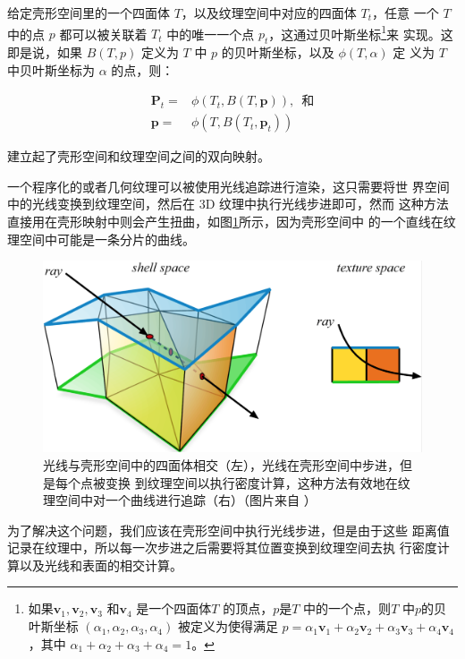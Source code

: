 给定壳形空间里的一个四面体 $T$，以及纹理空间中对应的四面体 $T_t$，任意 一个 $T$ 中的点 $p$ 都可以被关联着 $T_t$ 中的唯一一个点 $p_t$，这通过贝叶斯坐标\footnote{如果$\mathbf{v}_1,\mathbf{v}_2,\mathbf{v}_3$ 和$\mathbf{v}_4$ 是一个四面体$T$ 的顶点，$p$是$T$ 中的一个点，则$T$ 中$p$的贝 叶斯坐标 $(\alpha_1, \alpha_2, \alpha_3, \alpha_4)$ 被定义为使得满足 $p = \alpha_1\mathbf{v}_1 + \alpha_2\mathbf{v}_2 + \alpha_3\mathbf{v}_3 + \alpha_4\mathbf{v}_4$，其中 $\alpha_1 +\alpha_2 +\alpha_3 +\alpha_4 =1$。}来 实现。这即是说，如果 $B(T,p)$ 定义为 $T$ 中 $p$ 的贝叶斯坐标，以及 $\phi(T,\alpha)$ 定 义为 $T$ 中贝叶斯坐标为 $\alpha$ 的点，则：

\begin{equation}
\begin{aligned}
	\mathbf{P}_t=&\phi(T_t,B(T,\mathbf{p})) \text{,~~和}\\
	\mathbf{p}=&\phi(T,B(T_t,\mathbf{p}_t))
\end{aligned}
\end{equation}

\noindent 建立起了壳形空间和纹理空间之间的双向映射。

一个程序化的或者几何纹理可以被使用光线追踪进行渲染，这只需要将世 界空间中的光线变换到纹理空间，然后在 3D 纹理中执行光线步进即可，然而 这种方法直接用在壳形映射中则会产生扭曲，如图\ref{f:df-shell-maps-5}所示，因为壳形空间中 的一个直线在纹理空间中可能是一条分片的曲线。

\begin{figure}
	\includegraphics[width=\textwidth]{figures/df/shell-maps-5}
	\caption{光线与壳形空间中的四面体相交（左），光线在壳形空间中步进，但是每个点被变换 到纹理空间以执行密度计算，这种方法有效地在纹理空间中对一个曲线进行追踪（右）（图片来自 \cite{a:Shell-Maps}）}
	\label{f:df-shell-maps-5}
\end{figure}

为了解决这个问题，我们应该在壳形空间中执行光线步进，但是由于这些 距离值记录在纹理中，所以每一次步进之后需要将其位置变换到纹理空间去执 行密度计算以及光线和表面的相交计算。

